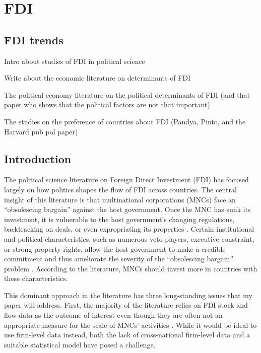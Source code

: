 \chapter{FDI}
\label{chap:FDI}

\section{FDI trends}

Intro about studies of FDI in political science

Write about the economic literature on determinants of FDI

The political economy literature on the political determinants of FDI (and that
paper who shows that the political factors are not that important)

The studies on the preference of countries about FDI (Pandya, Pinto, and the
Harvard pub pol paper)


\section{Introduction}
\label{sec:introduction}

The political science literature on Foreign Direct Investment (FDI) has focused
largely on how politics shapes the flow of FDI across countries. The central
insight of this literature is that multinational corporations (MNCs) face an
``obsolescing bargain'' against the host government. Once the MNC has sunk its
investment, it is vulnerable to the host government's changing regulations,
backtracking on deals, or even expropriating its properties \citep{Li2009a,
Sawant2010}. Certain institutional and political characteristics, such as
numerous veto players, executive constraint, or strong property rights, allow
the host government to make a credible commitment and thus ameliorate the
severity of the ``obsolescing bargain'' problem \citep{Busse2007, Jensen2014,
Li2003}. According to the literature, MNCs should invest more in countries with
these characteristics.

This dominant approach in the literature has three long-standing issues that my
paper will address. First, the majority of the literature relies on FDI stock
and flow data as the outcome of interest even though they are often not an
appropriate measure for the scale of MNCs' activities \citep{Kerner2014}. While
it would be ideal to use firm-level data instead, both the lack of
cross-national firm-level data and a suitable statistical model have posed a
challenge.

